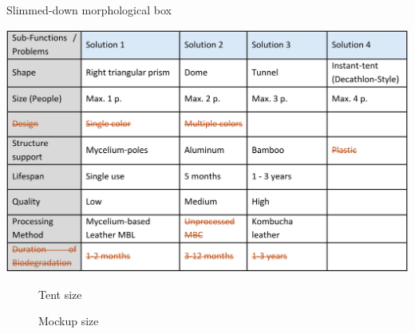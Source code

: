 \documentclass{article}
\begin{document}
\vfill
\begin{table}[ht!]
    \centering
    \caption{Slimmed-down morphological box}
    \label{tab:slimmed_morph}
    \includegraphics[width=\textwidth]{media/slimmed_morph.png}
\end{table}

\newpage
\begin{figure}[ht!]
    \centering
    
    \caption{Tent size}
    \label{pdf:tent-size}
\end{figure}

\newpage
\begin{figure}[ht!]
    \centering
    
    \caption{Mockup size}
    \label{pdf:mockup-size}
\end{figure}
\end{document}
